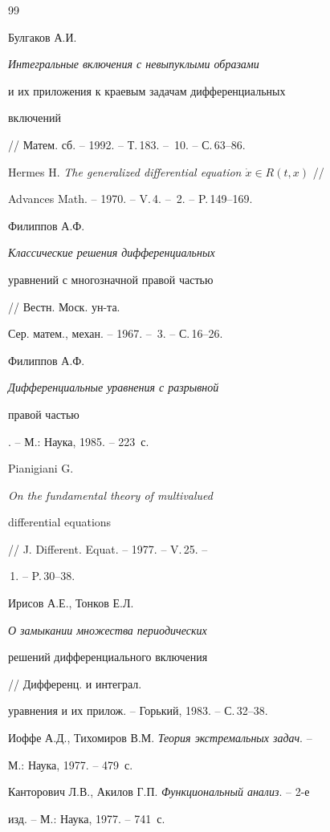 \begin{thebibliography}{99}







Булгаков А.И. {\em Интегральные включения с невыпуклыми образами


и их приложения к краевым задачам дифференциальных


включений} // Матем. сб. -- 1992. -- Т.\,183. -- \No\,10. -- С.\,63--86.




Hermes H. {\em The generalized differential equation $\Dot x\in R(t,x)$} //


Advances Math. -- 1970. -- V.\,4. -- \No\,2. -- P.\,149--169.




Филиппов А.Ф. {\em Классические решения дифференциальных


уравнений с многозначной правой частью} // Вестн. Моск. ун-та.


Сер. матем., механ. -- 1967. -- \No\,3. -- С.\,16--26.




Филиппов А.Ф. {\em Дифференциальные уравнения с разрывной


правой частью}. -- М.: Наука, 1985. -- 223~с.




Pianigiani G. {\em On the fundamental theory of multivalued


differential equations} // J. Different. Equat. -- 1977. -- V.\,25. --


\No\,1. -- P.\,30--38.




Ирисов А.Е., Тонков Е.Л. {\em О замыкании множества периодических


решений дифференциального включения} // Дифференц. и интеграл.


уравнения и их прилож. -- Горький, 1983. -- С.\,32--38.




Иоффе А.Д., Тихомиров В.М. {\em Теория экстремальных задач}. --


М.: Наука, 1977. -- 479~с.




Канторович Л.В., Акилов Г.П. {\em Функциональный анализ}. -- 2-е


изд. -- М.: Наука, 1977. -- 741~с.



\end{thebibliography}
